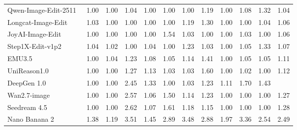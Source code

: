 \documentclass{llmxive}
\begin{document}
\begin{table}[t]
{\begin{tabular}{l|cccccccccc|c}
            Qwen-Image-Edit-2511~\cite{wu2025qwen}
            & 1.00 & 1.00 & 1.04 & 1.00 & 1.00 & 1.00 & 1.19 & 1.00 & 1.08 & 1.32
            & \cellcolor[HTML]{C8C8C8}1.04 \\

            Longcat-Image-Edit~\cite{team2025longcat}
            & 1.03 & 1.00 & 1.00 & 1.00 & 1.00 & 1.19 & 1.30 & 1.00 & 1.00 & 1.04
            & \cellcolor[HTML]{C8C8C8}1.06 \\
            
            JoyAI-Image-Edit~\cite{joyaiimage2026}
            & 1.00 & 1.00 & 1.00 & 1.00 & 1.54 & 1.03 & 1.00 & 1.00 & 1.03 & 1.00
            & \cellcolor[HTML]{C8C8C8} 1.06\\

            Step1X-Edit-v1p2~\cite{liu2025step1x}
            & 1.04 & 1.02 & 1.00 & 1.04 & 1.00 & 1.23 & 1.03 & 1.00 & 1.05 & 1.33
            & \cellcolor[HTML]{C8C8C8}1.07 \\
            
            EMU3.5~\cite{cui2025emu3}
            & 1.00 & 1.04 & 1.23 & 1.08 & 1.05 & 1.14 & 1.41 & 1.00 & 1.05 & 1.05
            & \cellcolor[HTML]{C8C8C8}1.11 \\   

            UniReason1.0~\cite{wang2026unireason}
            & 1.00 & 1.00 & 1.27 & 1.13 & 1.03 & 1.03 & 1.60 & 1.00 & 1.02 & 1.00
            & \cellcolor[HTML]{C8C8C8}1.12 \\

            DeepGen 1.0~\cite{wang2026deepgen}
            & 1.00 & 1.00 & 2.45 & 1.33 & 1.00 & 1.03 & 1.23 & 1.11 & 1.70 & 1.43
            & \cellcolor[HTML]{C8C8C8}{\textbf{1.33}} \\

            

            \midrule

            Wan2.7-image~\cite{nanobananapro}
            & 1.00 & 1.00 & 2.57 & 1.06 & 1.50 & 1.14 & 1.23 & 1.00 & 1.00 & 1.00
            & \cellcolor[HTML]{C8C8C8}1.27 \\

            Seedream 4.5~\cite{seedream2025seedream}
            & 1.00 & 1.00 & 2.62 & 1.07 & 1.61 & 1.18 & 1.15 & 1.00 & 1.00 & 1.00
            & \cellcolor[HTML]{C8C8C8}1.28 \\

            Nano Banana 2~\cite{gemini3pro}
            & 1.38 & 1.19 & 3.51 & 1.45 & 2.89 & 3.48 & 2.88 & 1.97 & 3.36 & 2.54
            & \cellcolor[HTML]{C8C8C8}2.49   \\


\end{tabular}}
\end{table}
\end{document}
